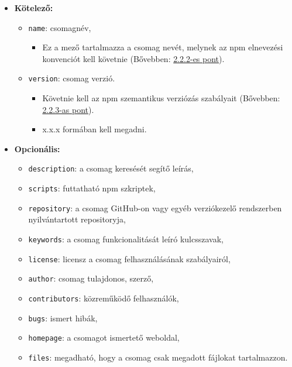 	\begin{itemize}
		\item \textbf{Kötelező:}
		\begin{itemize}
			\item \texttt{name}: csomagnév,
			\begin{itemize}
				\item Ez a mező tartalmazza a csomag nevét, melynek az npm elnevezési konvenciót kell követnie (Bővebben: \hyperlink{subsection.2.2.2}{2.2.2-es pont}).
			\end{itemize}
			\item \texttt{version}: csomag verzió.
			\begin{itemize}
				\item Követnie kell az npm szemantikus verziózás szabályait (Bővebben: \hyperlink{subsection.2.2.3}{2.2.3-as pont}).
				\item x.x.x formában kell megadni.
			\end{itemize}
		\end{itemize}
		\item \textbf{Opcionális:}
		\begin{itemize}
			\item \texttt{description}: a csomag keresését segítő leírás,	
			\item \texttt{scripts}: futtatható npm szkriptek,
			\item \texttt{repository}: a csomag GitHub-on vagy egyéb verziókezelő rendszerben nyilvántartott repositoryja,
			\item \texttt{keywords}: a csomag funkcionalitását leíró kulcsszavak,
			\item \texttt{license}: licensz a csomag felhasználásának szabályairól,
			\item \texttt{author}: csomag tulajdonos, szerző,
			\item \texttt{contributors}: közreműködő felhasználók,
			\item \texttt{bugs}: ismert hibák,
			\item \texttt{homepage}: a csomagot ismertető weboldal,
			\item \texttt{files}: megadható, hogy a csomag csak megadott fájlokat tartalmazzon.
			
			\clearpage
			

\end{itemize}
\end{itemize}
